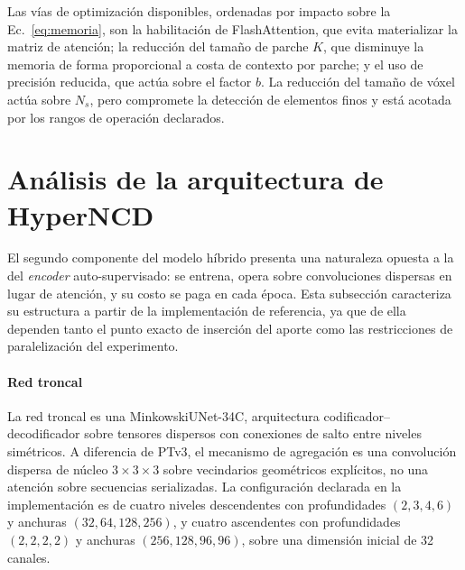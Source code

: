 Las vías de optimización disponibles, ordenadas por impacto sobre la
Ec.~\eqref{eq:memoria}, son la habilitación de FlashAttention, que evita
materializar la matriz de atención; la reducción del tamaño de parche $K$, que
disminuye la memoria de forma proporcional a costa de contexto por parche; y el
uso de precisión reducida, que actúa sobre el factor $b$. La reducción del tamaño
de vóxel actúa sobre $N_{s}$, pero compromete la detección de elementos finos y
está acotada por los rangos de operación declarados.

\section{Análisis de la arquitectura de HyperNCD}
\label{sec:arq-hyperncd}

El segundo componente del modelo híbrido presenta una naturaleza opuesta a la del
\emph{encoder} auto-supervisado: se entrena, opera sobre convoluciones dispersas
en lugar de atención, y su costo se paga en cada época. Esta subsección
caracteriza su estructura a partir de la implementación de referencia, ya que de
ella dependen tanto el punto exacto de inserción del aporte como las
restricciones de paralelización del experimento.

\paragraph*{Red troncal}
La red troncal es una MinkowskiUNet-34C, arquitectura codificador--decodificador
sobre tensores dispersos con conexiones de salto entre niveles simétricos. A
diferencia de PTv3, el mecanismo de agregación es una convolución dispersa de
núcleo $3\times3\times3$ sobre vecindarios geométricos explícitos, no una
atención sobre secuencias serializadas. La configuración declarada en la
implementación es de cuatro niveles descendentes con profundidades
$(2,3,4,6)$ y anchuras $(32,64,128,256)$, y cuatro ascendentes con
profundidades $(2,2,2,2)$ y anchuras $(256,128,96,96)$, sobre una dimensión
inicial de 32 canales.

